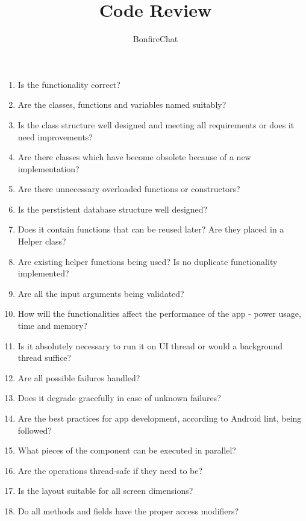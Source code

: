 \documentclass[accentcolor=tud2d,12pt,paper=a4,colorbacktitle]{tudexercise}
\title{Code Review}
\subtitle{BonfireChat}
\begin{document}
  \maketitle

  \begin{enumerate}[ 1.]
    \item Is the functionality correct?
    \item Are the classes, functions and variables named suitably?
    \item Is the class structure well designed and meeting all requirements or does it need improvements?
    \item Are there classes which have become obsolete because of a new implementation?
    \item Are there unnecessary overloaded functions or constructors?
    \item Is the perstistent database structure well designed?
    \item Does it contain functions that can be reused later? Are they placed in a Helper class?
    \item Are existing helper functions being used? Is no duplicate functionality implemented?
    \item Are all the input arguments being validated?
    \item How will the functionalities affect the performance of the app - power usage, time and memory?
    \item Is it absolutely necessary to run it on UI thread or would a background thread suffice?
    \item Are all possible failures handled?
    \item Does it degrade gracefully in case of unknown failures?
    \item Are the best practices for app development, according to Android lint, being followed?
    \item What pieces of the component can be executed in parallel?
    \item Are the operations thread-safe if they need to be?
    \item Is the layout suitable for all screen dimensions?
    \item Do all methods and fields have the proper access modifiers?
  \end{enumerate}
\end{document}
